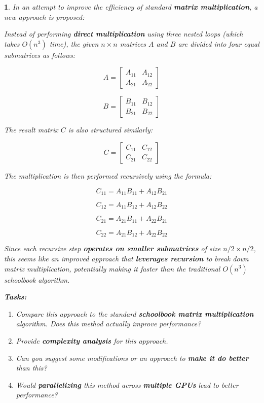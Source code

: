 \documentclass[%
addpoints]{exam}
\theoremstyle{problem}
\newtheorem{p}{}
\begin{document}
\begin{p}
In an attempt to improve the efficiency of standard \textbf{matrix multiplication}, a new approach is proposed:

Instead of performing \textbf{direct multiplication} using three nested loops (which takes $O(n^3)$ time), the given $n \times n$ matrices $A$ and $B$ are divided into four equal submatrices as follows:

\[
A =
\begin{bmatrix}
A_{11} & A_{12} \\
A_{21} & A_{22}
\end{bmatrix}
\]

\[
B =
\begin{bmatrix}
B_{11} & B_{12} \\
B_{21} & B_{22}
\end{bmatrix}
\]

The result matrix $C$ is also structured similarly:

\[
C =
\begin{bmatrix}
C_{11} & C_{12} \\
C_{21} & C_{22}
\end{bmatrix}
\]

The multiplication is then performed recursively using the formula:

\[
C_{11} = A_{11} B_{11} + A_{12} B_{21}
\]

\[
C_{12} = A_{11} B_{12} + A_{12} B_{22}
\]

\[
C_{21} = A_{21} B_{11} + A_{22} B_{21}
\]

\[
C_{22} = A_{21} B_{12} + A_{22} B_{22}
\]

Since each recursive step \textbf{operates on smaller submatrices} of size $n/2 \times n/2$, this seems like an improved approach that \textbf{leverages recursion} to break down matrix multiplication, potentially making it faster than the traditional $O(n^3)$ schoolbook algorithm.

\textbf{Tasks:}

\begin{enumerate}
    \item Compare this approach to the standard \textbf{schoolbook matrix multiplication} algorithm. Does this method actually improve performance?
    \item Provide \textbf{complexity analysis} for this approach.
    \item Can you suggest some modifications or an approach to \textbf{make it do better} than this?
    \item Would \textbf{parallelizing} this method across \textbf{multiple GPUs} lead to better performance?
\end{enumerate}
\hfill\end{p}
\end{document}
